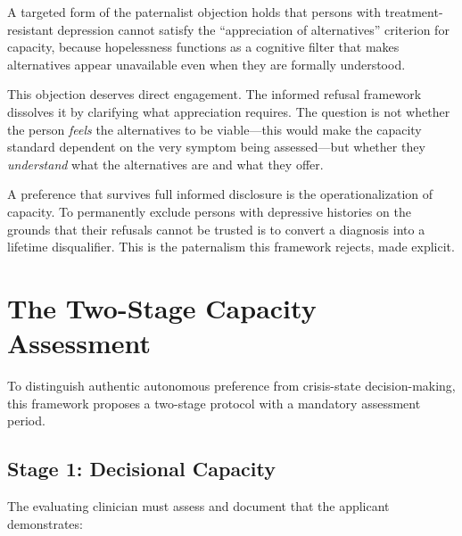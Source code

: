 \documentclass[11pt, letterpaper]{article}
\begin{document}
A targeted form of the paternalist objection holds that persons with treatment-resistant
depression cannot satisfy the ``appreciation of alternatives'' criterion for capacity,
because hopelessness functions as a cognitive filter that makes alternatives appear
unavailable even when they are formally understood.

This objection deserves direct engagement. The informed refusal framework dissolves it by
clarifying what appreciation requires. The question is not whether the person \emph{feels}
the alternatives to be viable---this would make the capacity standard dependent on the
very symptom being assessed---but whether they \emph{understand} what the alternatives are
and what they offer.

A preference that survives full informed disclosure is the operationalization of capacity.
To permanently exclude persons with depressive histories on the grounds that their refusals
cannot be trusted is to convert a diagnosis into a lifetime disqualifier. This is the
paternalism this framework rejects, made explicit.

\newpage

\section{The Two-Stage Capacity Assessment}

To distinguish authentic autonomous preference from crisis-state decision-making, this
framework proposes a two-stage protocol with a mandatory assessment period.

\subsection{Stage 1: Decisional Capacity}

The evaluating clinician must assess and document that the applicant demonstrates:
\end{document}
